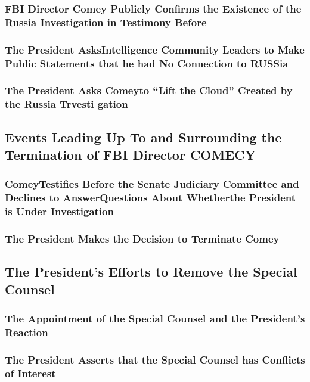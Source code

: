 \subsubsection{FBI Director Comey Publicly Confirms the Existence of the Russia Investigation in Testimony Before}

\subsubsection{The President AsksIntelligence Community Leaders to Make Public Statements that he had No Connection to RUSSia}

\subsubsection{The President Asks Comeyto “Lift the Cloud” Created by the Russia Trvesti gation}

\subsection{Events Leading Up To and Surrounding the Termination of FBI Director COMECY}

\subsubsection{ComeyTestifies Before the Senate Judiciary Committee and Declines to AnswerQuestions About Whetherthe President is Under Investigation}

\subsubsection{The President Makes the Decision to Terminate Comey}

\subsection{The President’s Efforts to Remove the Special Counsel}

\subsubsection{The Appointment of the Special Counsel and the President’s Reaction}

\subsubsection{The President Asserts that the Special Counsel has Conflicts of Interest}

